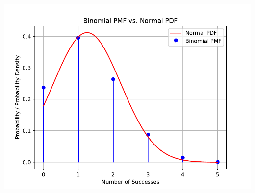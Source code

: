 \documentclass[journal,12pt,twocolumn]{IEEEtran}
\theoremstyle{remark}
\begin{document}
\begin{enumerate}[label=(\roman*)]
\includegraphics[width=\columnwidth]{ncert/9/3/8/figs/plot.pdf}
\end{enumerate}
\end{document}
